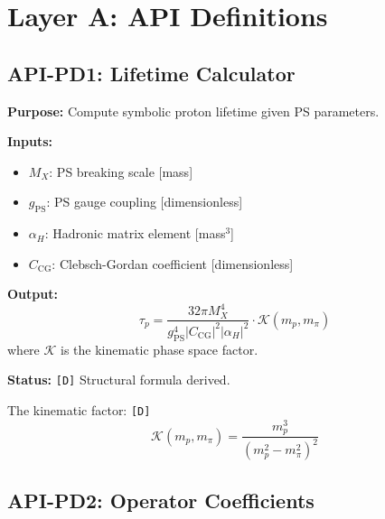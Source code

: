 \documentclass[11pt,a4paper]{article}
\newcommand{\tagD}{\textcolor{green!50!black}{\texttt{[D]}}}
\theoremstyle{definition}
\begin{document}
\section{Layer A: API Definitions}
\label{sec:api}

\subsection{API-PD1: Lifetime Calculator}
\label{subsec:api-pd1}

\begin{apibox}
\textbf{Purpose:} Compute symbolic proton lifetime given PS parameters.

\textbf{Inputs:}
\begin{itemize}
  \item $M_X$: PS breaking scale [mass]
  \item $g_{\text{PS}}$: PS gauge coupling [dimensionless]
  \item $\alpha_H$: Hadronic matrix element [mass$^3$]
  \item $C_{\text{CG}}$: Clebsch-Gordan coefficient [dimensionless]
\end{itemize}

\textbf{Output:}
\begin{equation}
\label{eq:api-pd1}
\tau_p = \frac{32\pi M_X^4}{g_{\text{PS}}^4 |C_{\text{CG}}|^2 |\alpha_H|^2}
\cdot \mathcal{K}(m_p, m_\pi)
\end{equation}
where $\mathcal{K}$ is the kinematic phase space factor.

\textbf{Status:} \tagD{} Structural formula derived.
\end{apibox}

The kinematic factor: \tagD{}
\begin{equation}
\label{eq:kinematic-k}
\mathcal{K}(m_p, m_\pi) = \frac{m_p^3}{(m_p^2 - m_\pi^2)^2}
\end{equation}

\subsection{API-PD2: Operator Coefficients}
\label{subsec:api-pd2}
\end{document}
